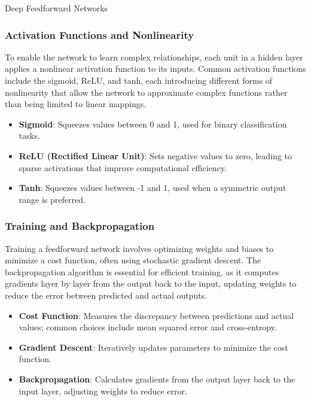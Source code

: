 \begin{notes}{Deep Feedforward Networks}
    \subsubsection*{Activation Functions and Nonlinearity}
    
    To enable the network to learn complex relationships, each unit in a hidden layer applies a nonlinear activation function to its inputs. Common activation functions include the sigmoid, ReLU, and tanh, each 
    introducing different forms of nonlinearity that allow the network to approximate complex functions rather than being limited to linear mappings.
    
    \begin{highlight}
        \begin{itemize}
            \item \textbf{Sigmoid}: Squeezes values between 0 and 1, used for binary classification tasks.
            \item \textbf{ReLU (Rectified Linear Unit)}: Sets negative values to zero, leading to sparse activations that improve computational efficiency.
            \item \textbf{Tanh}: Squeezes values between -1 and 1, used when a symmetric output range is preferred.
        \end{itemize}
    \end{highlight}
    
    \subsubsection*{Training and Backpropagation}
    
    Training a feedforward network involves optimizing weights and biases to minimize a cost function, often using stochastic gradient descent. The backpropagation algorithm is essential for efficient training, 
    as it computes gradients layer by layer from the output back to the input, updating weights to reduce the error between predicted and actual outputs.
    
    \begin{highlight}
        \begin{itemize}
            \item \textbf{Cost Function}: Measures the discrepancy between predictions and actual values; common choices include mean squared error and cross-entropy.
            \item \textbf{Gradient Descent}: Iteratively updates parameters to minimize the cost function.
            \item \textbf{Backpropagation}: Calculates gradients from the output layer back to the input layer, adjusting weights to reduce error.
        \end{itemize}
    \end{highlight}
    

\end{notes}
